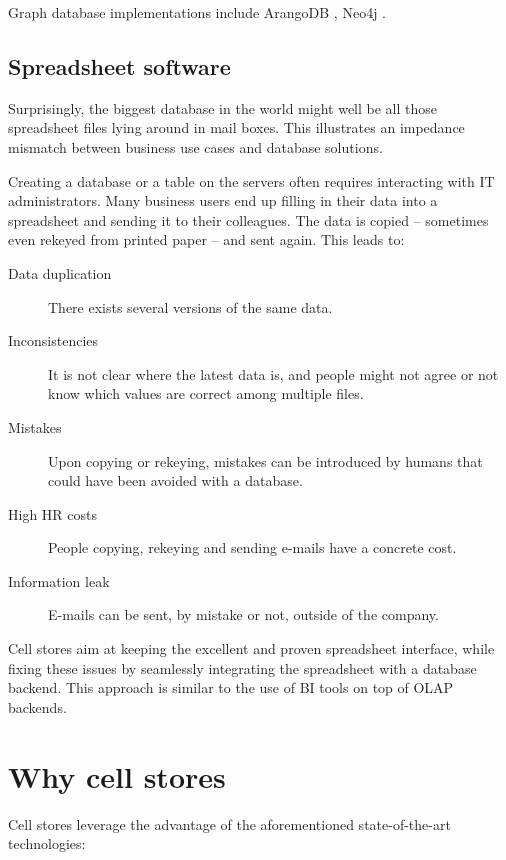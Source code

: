 \documentclass{acm_proc_article-sp}
\begin{document}
Graph database implementations include ArangoDB \cite{ArangoDB}, Neo4j \cite{Neo4j}.

\subsection{Spreadsheet software}

Surprisingly, the biggest database in the world might well be all those spreadsheet files lying around in mail boxes. This illustrates an impedance mismatch between business use cases and database solutions.

Creating a database or a table on the servers often requires interacting with IT administrators. Many business users end up filling in their data into a spreadsheet and sending it to their colleagues. The data is copied -- sometimes even rekeyed from printed paper -- and sent again. This leads to:

\begin{description}
\item[Data duplication] There exists several versions of the same data.
\item [Inconsistencies] It is not clear where the latest data is, and people might not agree or not know which values are correct among multiple files.
\item[Mistakes] Upon copying or rekeying, mistakes can be introduced by humans that could have been avoided with a database.
\item[High HR costs] People copying, rekeying and sending e-mails have a concrete cost.
\item[Information leak] E-mails can be sent, by mistake or not, outside of the company.
\end{description}

Cell stores aim at keeping the excellent and proven spreadsheet interface, while fixing these issues by seamlessly integrating the spreadsheet with a database backend. This approach is similar to the use of BI tools on top of OLAP backends.

\section{Why cell stores}
\label{section-why}

Cell stores leverage the advantage of the aforementioned state-of-the-art technologies:
\end{document}
